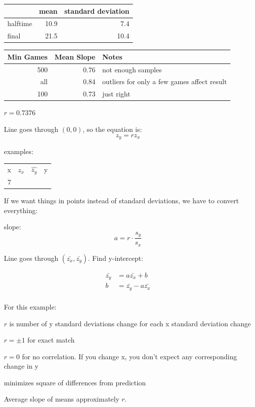 \documentclass[landscape]{exam}
\begin{document}
  \begin{tabular}[H]{lrr}
    \toprule
             & mean & standard deviation \\
    \midrule
    halftime & 10.9 & 7.4 \\
    final    & 21.5 & 10.4 \\
    \bottomrule
  \end{tabular}

  \begin{tabular}[H]{rrl}
    \toprule
    Min Games & Mean Slope & Notes \\
    \midrule
    500       & 0.76       & not enough samples\\
    all       & 0.84       & outliers for only a few games affect result \\
    100       & 0.73       & just right \\
    \bottomrule
  \end{tabular}

    $r = 0.7376$

    Line goes through $(0, 0)$, so the equation is:
    \[
      z_y = r z_x
    \]


    examples:
    \begin{tabular}[H]{rrrr}
      x & $z_x$ & $\hat{z_y}$ & y \\
      7 & 
    \end{tabular}
    If we want things in points instead of standard deviations, we have to convert
    everything:

    slope:
    \[
      a = r \cdot \frac{s_y}{s_x}
    \]

    Line goes through $(\bar{z_x}, \bar{z_y})$.  Find y-intercept:

    \begin{align*}
      \bar{z_y} & = a \bar{z_x} + b \\
      b         & = \bar{z_y} - a \bar{z_x} \\
    \end{align*}

    For this example:
    \begin{itemize*}
      \item $r$ is number of y standard deviations change for each x standard
        deviation change 

      \item $r = \pm 1$ for exact match

      \item $r = 0$ for no correlation.  If you change x, you don't expect any
        corresponding change in y

      \item minimizes square of differences from prediction
    \end{itemize*}

    Average slope of means approximately $r$.
\end{document}
